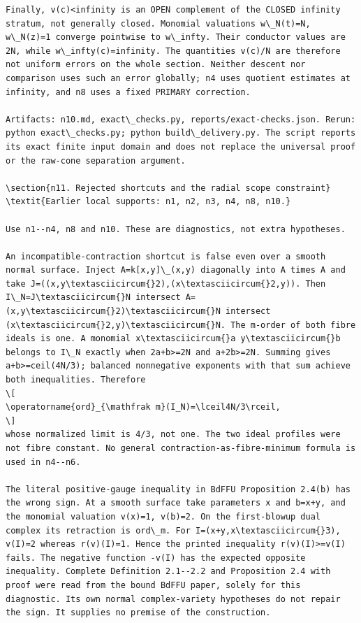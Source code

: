 \documentclass[
  11pt,
]{article}
\begin{document}
\begin{lstlisting}
Finally, v(c)<infinity is an OPEN complement of the CLOSED infinity stratum, not generally closed. Monomial valuations w\_N(t)=N, w\_N(z)=1 converge pointwise to w\_infty. Their conductor values are 2N, while w\_infty(c)=infinity. The quantities v(c)/N are therefore not uniform errors on the whole section. Neither descent nor comparison uses such an error globally; n4 uses quotient estimates at infinity, and n8 uses a fixed PRIMARY correction.

Artifacts: n10.md, exact\_checks.py, reports/exact-checks.json. Rerun: python exact\_checks.py; python build\_delivery.py. The script reports its exact finite input domain and does not replace the universal proof or the raw-cone separation argument.

\section{n11. Rejected shortcuts and the radial scope constraint}
\textit{Earlier local supports: n1, n2, n3, n4, n8, n10.}

Use n1--n4, n8 and n10. These are diagnostics, not extra hypotheses.

An incompatible-contraction shortcut is false even over a smooth normal surface. Inject A=k[x,y]\_(x,y) diagonally into A times A and take J=((x,y\textasciicircum{}2),(x\textasciicircum{}2,y)). Then I\_N=J\textasciicircum{}N intersect A=(x,y\textasciicircum{}2)\textasciicircum{}N intersect (x\textasciicircum{}2,y)\textasciicircum{}N. The m-order of both fibre ideals is one. A monomial x\textasciicircum{}a y\textasciicircum{}b belongs to I\_N exactly when 2a+b>=2N and a+2b>=2N. Summing gives a+b>=ceil(4N/3); balanced nonnegative exponents with that sum achieve both inequalities. Therefore
\[
\operatorname{ord}_{\mathfrak m}(I_N)=\lceil4N/3\rceil,
\]
whose normalized limit is 4/3, not one. The two ideal profiles were not fibre constant. No general contraction-as-fibre-minimum formula is used in n4--n6.

The literal positive-gauge inequality in BdFFU Proposition 2.4(b) has the wrong sign. At a smooth surface take parameters x and b=x+y, and the monomial valuation v(x)=1, v(b)=2. On the first-blowup dual complex its retraction is ord\_m. For I=(x+y,x\textasciicircum{}3), v(I)=2 whereas r(v)(I)=1. Hence the printed inequality r(v)(I)>=v(I) fails. The negative function -v(I) has the expected opposite inequality. Complete Definition 2.1--2.2 and Proposition 2.4 with proof were read from the bound BdFFU paper, solely for this diagnostic. Its own normal complex-variety hypotheses do not repair the sign. It supplies no premise of the construction.


\end{lstlisting}
\end{document}
